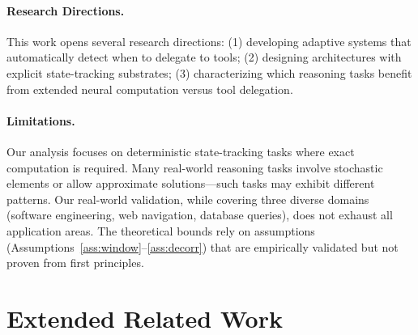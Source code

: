 \documentclass{article}
\theoremstyle{plain}
\theoremstyle{definition}
\theoremstyle{remark}
\begin{document}
\paragraph{Research Directions.} This work opens several research directions: (1) developing adaptive systems that automatically detect when to delegate to tools; (2) designing architectures with explicit state-tracking substrates; (3) characterizing which reasoning tasks benefit from extended neural computation versus tool delegation.

\paragraph{Limitations.} Our analysis focuses on deterministic state-tracking tasks where exact computation is required. Many real-world reasoning tasks involve stochastic elements or allow approximate solutions---such tasks may exhibit different patterns. Our real-world validation, while covering three diverse domains (software engineering, web navigation, database queries), does not exhaust all application areas. The theoretical bounds rely on assumptions (Assumptions~\ref{ass:window}--\ref{ass:decorr}) that are empirically validated but not proven from first principles.






\newpage
\appendix
\onecolumn

\section{Extended Related Work}
\label{app:related}
\end{document}

